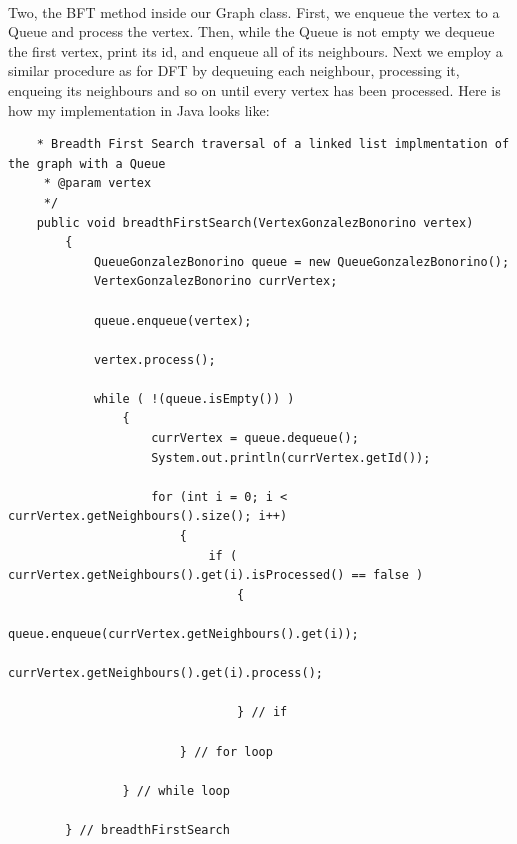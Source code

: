 \documentclass[letterpaper, 10pt]{article}
\begin{document}
\\
Two, the BFT method inside our Graph class. First, we enqueue the vertex to a Queue and process the vertex. Then, while the Queue is not empty we dequeue the first vertex, print its id, and enqueue all of its neighbours. Next we employ a similar procedure as for DFT by dequeuing each neighbour, processing it, enqueing its neighbours and so on until every vertex has been processed. Here is how my implementation in Java looks like:
\\
\begin{lstlisting}
    * Breadth First Search traversal of a linked list implmentation of the graph with a Queue
     * @param vertex
     */
    public void breadthFirstSearch(VertexGonzalezBonorino vertex)
	    {
	    	QueueGonzalezBonorino queue = new QueueGonzalezBonorino();
	    	VertexGonzalezBonorino currVertex;
	    	
	    	queue.enqueue(vertex);
	    	
	    	vertex.process();
	    	
	    	while ( !(queue.isEmpty()) )
		    	{
		    		currVertex = queue.dequeue();
		    		System.out.println(currVertex.getId());
		    		
		    		for (int i = 0; i < currVertex.getNeighbours().size(); i++)
			    		{
			    			if ( currVertex.getNeighbours().get(i).isProcessed() == false )
				    			{
				    				queue.enqueue(currVertex.getNeighbours().get(i));
				    				currVertex.getNeighbours().get(i).process();
				    				
				    			} // if
			    				
			    		} // for loop
			    		
		    	} // while loop
	    	
	    } // breadthFirstSearch
\end{lstlisting}
\\
\end{document}
